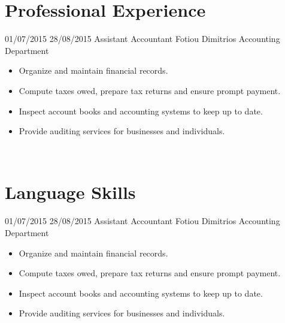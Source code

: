 \documentclass[letterpaper]{engineer_cv} %
\begin{document}

	\section{Professional Experience}

	\begin{longList} %
		\longListItem
			{01/07/2015}
			{28/08/2015}
			{Assistant Accountant}
			{Fotiou Dimitrios Accounting Department}
			{}
			{\begin{itemize}
				\item Organize and maintain financial records.
				\item Compute taxes owed, prepare tax returns and ensure prompt payment.
                \item Inspect account books and accounting systems to keep up to date.
                \item Provide auditing services for businesses and individuals.
			\end{itemize}}
			\\
        \end{longList}


	\section{Language Skills}

	\begin{longList} %
		\longListItem
			{01/07/2015}
			{28/08/2015}
			{Assistant Accountant}
			{Fotiou Dimitrios Accounting Department}
			{}
			{\begin{itemize}
				\item Organize and maintain financial records.
				\item Compute taxes owed, prepare tax returns and ensure prompt payment.
                \item Inspect account books and accounting systems to keep up to date.
                \item Provide auditing services for businesses and individuals.
			\end{itemize}}
			\\
        \end{longList}
\end{document}
